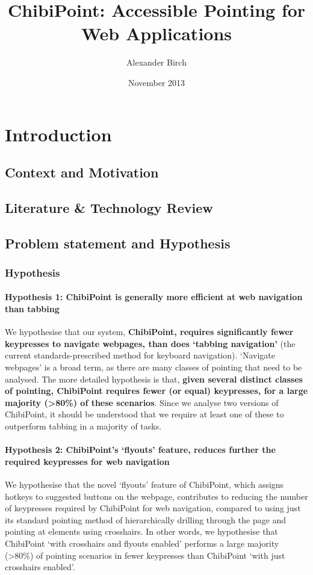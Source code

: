 \documentclass[a4paper, 12pt]{report}
\title{ChibiPoint: Accessible Pointing for Web Applications}
\author{Alexander Birch}
\date{November 2013}
\begin{document}

\maketitle
\tableofcontents


\chapter{Introduction}

\section{Context and Motivation}
\section{Literature \& Technology Review}
\section{Problem statement and Hypothesis}
\subsection{Hypothesis}
\subsubsection{Hypothesis 1: ChibiPoint is generally more efficient at web navigation than tabbing}
We hypothesise that our system, \textbf{ChibiPoint, requires significantly fewer keypresses to navigate webpages, than does `tabbing navigation'} (the current standards-prescribed method for keyboard navigation).
`Navigate webpages' is a broad term, as there are many classes of pointing that need to be analysed. The more detailed hypothesis is that, \textbf{given several distinct classes of pointing, ChibiPoint requires fewer (or equal) keypresses, for a large majority (>80\%) of these scenarios}. Since we analyse two versions of ChibiPoint, it should be understood that we require at least one of these to outperform tabbing in a majority of tasks.

\subsubsection{Hypothesis 2: ChibiPoint's `flyouts' feature, reduces further the required keypresses for web navigation}
We hypothesise that the novel `flyouts' feature of ChibiPoint, which assigns hotkeys to suggested buttons on the webpage, contributes to reducing the number of keypresses required by ChibiPoint for web navigation, compared to using just its standard pointing method of hierarchically drilling through the page and pointing at elements using crosshairs.
In other words, we hypothesise that ChibiPoint `with crosshairs and flyouts enabled' performs a large majority (>80\%) of pointing scenarios in fewer keypresses than ChibiPoint `with just crosshairs enabled'.
\end{document}

